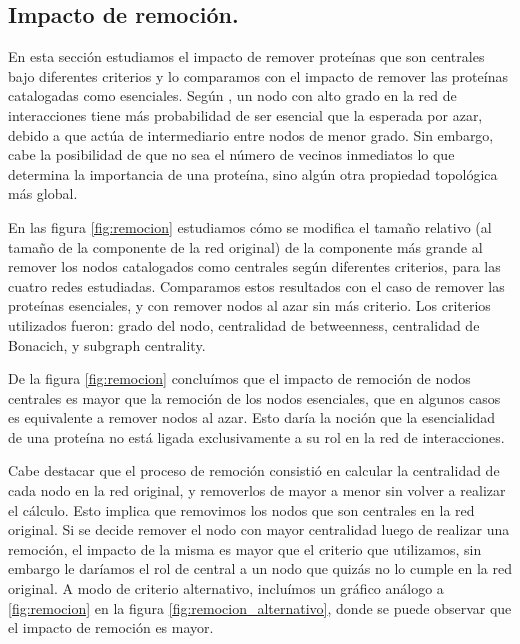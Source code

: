 
\subsection{Impacto de remoción.}

\par En esta sección estudiamos el impacto de remover proteínas que son centrales bajo diferentes criterios y lo comparamos con el impacto de remover las proteínas catalogadas como esenciales. Según \cite{jeong2000}, un nodo con alto grado en la red de interacciones tiene más probabilidad de ser esencial que la esperada por azar, debido a que actúa de intermediario entre nodos de menor grado. Sin embargo, cabe la posibilidad de que no sea el número de vecinos inmediatos lo que determina la importancia de una proteína, sino algún otra propiedad topológica más global.
\par En las figura \ref{fig:remocion} estudiamos cómo se modifica el tamaño relativo (al tamaño de la componente de la red original) de la componente más grande al remover los nodos catalogados como centrales según diferentes criterios, para las cuatro redes estudiadas. Comparamos estos resultados con el caso de remover las proteínas esenciales, y con remover nodos al azar sin más criterio. Los criterios utilizados fueron: grado del nodo, centralidad de betweenness, centralidad de Bonacich, y subgraph centrality. 
\par De la figura \ref{fig:remocion} concluímos que el impacto de remoción de nodos centrales es mayor que la remoción de los nodos esenciales, que en algunos casos es equivalente a remover nodos al azar. Esto daría la noción que la esencialidad de una proteína no está ligada exclusivamente a su rol en la red de interacciones.
\par Cabe destacar que el proceso de remoción consistió en calcular la centralidad de cada nodo en la red original, y removerlos de mayor a menor sin volver a realizar el cálculo. Esto implica que removimos los nodos que son centrales en la red original. Si se decide remover el nodo con mayor centralidad luego de realizar una remoción, el impacto de la misma es mayor que el criterio que utilizamos, sin embargo le daríamos el rol de central a un nodo que quizás no lo cumple en la red original. A modo de criterio alternativo, incluímos un gráfico análogo a \ref{fig:remocion} en la figura \ref{fig:remocion_alternativo}, donde se puede observar que el impacto de remoción es mayor.
 
